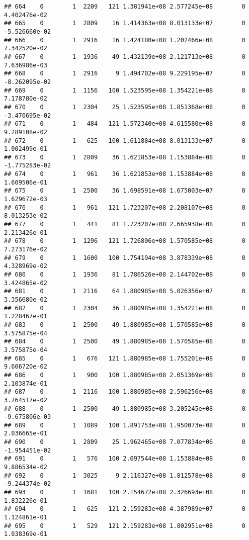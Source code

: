 \documentclass[
]{article}
\begin{document}
\begin{enumerate}
\begin{verbatim}
## 664    0        1  2209   121 1.381941e+08 2.577245e+08        0  4.402476e-02
## 665    0        1  2809    16 1.414363e+08 8.013133e+07        0 -5.526660e-02
## 666    0        1  2916    16 1.424180e+08 1.202466e+08        0  7.342520e-02
## 667    0        1  1936    49 1.432139e+08 2.121713e+08        0  7.636986e-03
## 668    0        1  2916     9 1.494702e+08 9.229195e+07        0 -8.262095e-02
## 669    0        1  1156   100 1.523595e+08 1.354221e+08        0  7.178780e-02
## 670    0        1  2304    25 1.523595e+08 1.851368e+08        0 -3.470695e-02
## 671    0        1   484   121 1.572340e+08 4.615580e+08        0  9.289108e-02
## 672    0        1   625   100 1.611884e+08 8.013133e+07        0  1.002499e-01
## 673    0        1  2809    36 1.621853e+08 1.153884e+08        0 -1.775283e-02
## 674    0        1   961    36 1.621853e+08 1.153884e+08        0  1.609506e-01
## 675    0        1  2500    36 1.698591e+08 1.675003e+07        0  1.629672e-03
## 676    0        1   961   121 1.723207e+08 2.208107e+08        0  8.013253e-02
## 677    0        1   441    81 1.723207e+08 2.665938e+08        0  2.213426e-01
## 678    0        1  1296   121 1.726806e+08 1.570585e+08        0  7.273176e-02
## 679    0        1  1600   100 1.754194e+08 3.878339e+08        0  4.328969e-02
## 680    0        1  1936    81 1.786526e+08 2.144702e+08        0  3.424865e-02
## 681    0        1  2116    64 1.880985e+08 5.026356e+07        0  3.356680e-02
## 682    0        1  2304    36 1.880985e+08 1.354221e+08        0  1.228467e-01
## 683    0        1  2500    49 1.880985e+08 1.570585e+08        0  3.575875e-04
## 684    0        1  2500    49 1.880985e+08 1.570585e+08        0  3.575875e-04
## 685    0        1   676   121 1.880985e+08 1.755201e+08        0  9.606720e-02
## 686    0        1   900   100 1.880985e+08 2.051369e+08        0  2.103874e-01
## 687    0        1  2116   100 1.880985e+08 2.596256e+08        0  3.764517e-02
## 688    0        1  2500    49 1.880985e+08 3.205245e+08        0 -9.675806e-03
## 689    0        1  1089   100 1.891753e+08 1.950073e+08        0  2.036665e-01
## 690    0        1  2809    25 1.962465e+08 7.077834e+06        0 -1.954451e-02
## 691    0        1   576   100 2.097544e+08 1.153884e+08        0  9.886534e-02
## 692    0        1  3025     9 2.116327e+08 1.812578e+08        0 -9.244374e-02
## 693    0        1  1681   100 2.154672e+08 2.326693e+08        0  1.832226e-01
## 694    0        1   625   121 2.159283e+08 4.387989e+07        0  1.124861e-01
## 695    0        1   529   121 2.159283e+08 1.802951e+08        0  1.038369e-01

\end{verbatim}
\end{enumerate}
\end{document}
